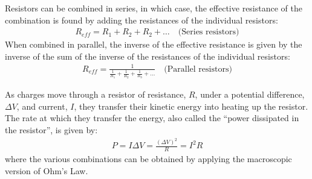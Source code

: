 \begin{chapterSummary}
Resistors can be combined in series, in which case, the effective resistance of the combination is found by adding the resistances of the individual resistors:
\begin{align*}
R_{eff}=R_1+R_2+R_2+\dots\quad\text{(Series resistors)}
\end{align*}
When combined in parallel, the inverse of the effective resistance is given by the inverse of the sum of the inverse of the resistances of the individual resistors:
\begin{align*}
R_{eff}=\frac{1}{\frac{1}{R_1}+\frac{1}{R_2}+\frac{1}{R_3}+\dots}\quad\text{(Parallel resistors)}
\end{align*}

As charges move through a resistor of resistance, $R$, under a potential difference, $\Delta V$, and current, $I$, they transfer their kinetic energy into heating up the resistor. The rate at which they transfer the energy, also called the ``power dissipated in the resistor'', is given by:
\begin{align*}
P=I \Delta V=\frac{(\Delta V)^2}{R}=I^2R
\end{align*}
where the various combinations can be obtained by applying the macroscopic version of Ohm's Law.


\end{chapterSummary}
